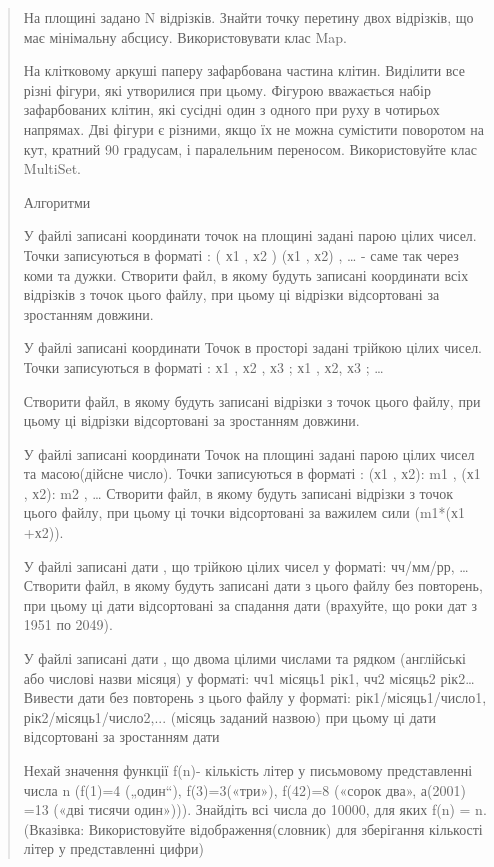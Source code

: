 \documentclass[]{article}
\begin{document}
\begin{quote}
На площині задано N відрізків. Знайти точку перетину двох відрізків, що
має мінімальну абсцису. Використовувати клас Map.

На клітковому аркуші паперу зафарбована частина клітин. Виділити все
різні фігури, які утворилися при цьому. Фігурою вважається набір
зафарбованих клітин, які сусідні один з одного при руху в чотирьох
напрямах. Дві фігури є різними, якщо їх не можна сумістити поворотом на
кут, кратний 90 градусам, і паралельним переносом. Використовуйте клас
MultiSet.

\protect\hypertarget{_Hlk65952040}{}{}

Алгоритми

\protect\hypertarget{_Hlk65952480}{}{}У файлі записані координати точок
на площині задані парою цілих чисел. Точки записуються в форматі : ( х1
, х2 ) (х1 , х2) , \ldots{} - саме так через коми та дужки. Створити
файл, в якому будуть записані координати всіх відрізків з точок цього
файлу, при цьому ці відрізки відсортовані за зростанням довжини.

\protect\hypertarget{_Hlk65952507}{}{}У файлі записані координати Точок
в просторі задані трійкою цілих чисел. Точки записуються в форматі : х1
, х2 , х3 ; х1 , х2, х3 ; \ldots{}

Створити файл, в якому будуть записані відрізки з точок цього файлу, при
цьому ці відрізки відсортовані за зростанням довжини.

У файлі записані координати Точок на площині задані парою цілих чисел та
масою(дійсне число). Точки записуються в форматі : (х1 , х2): m1 , (х1 ,
х2): m2 , \ldots{} Створити файл, в якому будуть записані відрізки з
точок цього файлу, при цьому ці точки відсортовані за важилем сили
(m1*(х1 +х2)).

У файлі записані дати , що трійкою цілих чисел у форматі: чч/мм/рр,
\ldots{} Створити файл, в якому будуть записані дати з цього файлу без
повторень, при цьому ці дати відсортовані за спадання дати (врахуйте, що
роки дат з 1951 по 2049).

У файлі записані дати , що двома цілими числами та рядком (англійські
або числові назви місяця) у форматі: чч1 місяць1 рік1, чч2 місяць2
рік2\ldots{}Вивести дати без повторень з цього файлу у форматі:
рік1/місяць1/число1, рік2/місяць1/число2,... (місяць заданий назвою) при
цьому ці дати відсортовані за зростанням дати

\protect\hypertarget{_Hlk65952388}{}{}

Нехай значення функції f(n)- кількість літер у письмовому представленні
числа n (f(1)=4 („один``), f(3)=3(«три»), f(42)=8 («сорок два», а(2001)
=13 («дві тисячи один»))). Знайдіть всі числа до 10000, для яких f(n) =
n. (Вказівка: Використовуйте відображення(словник) для зберігання
кількості літер у представленні цифри)


\end{quote}
\end{document}

